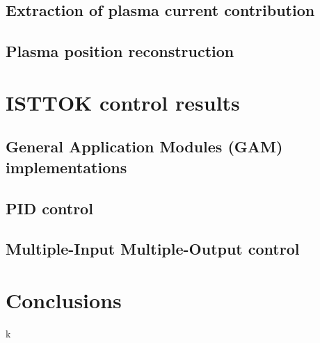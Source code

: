\documentclass{article}
\begin{document}
\subsection{Extraction of plasma current contribution}
\subsection{Plasma position reconstruction}

\hfil
\section{ISTTOK control results }
\subsection{General Application Modules (GAM) implementations}
\subsection{PID control}
\subsection{Multiple-Input Multiple-Output control}
\hfil

\section{Conclusions}
k
\end{document}

